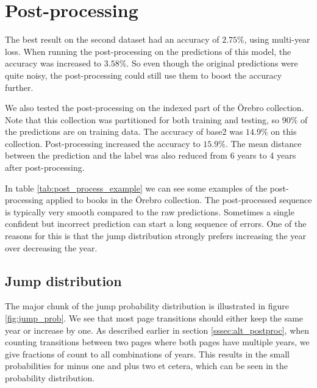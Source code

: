 


\section{Post-processing} \label{sec:result_post_process}

The best result on the second dataset had an accuracy of $2.75\%$, using multi-year loss. When running the post-processing on the predictions of this model, the accuracy was increased to $3.58\%$. So even though the original predictions were quite noisy, the post-processing could still use them to boost the accuracy further.

We also tested the post-processing on the indexed part of the Örebro collection. Note that this collection was partitioned for both training and testing, so $90\%$ of the predictions are on training data. The accuracy of base2 was $14.9\%$ on this collection. Post-processing increased the accuracy to $15.9\%$. The mean distance between the prediction and the label was also reduced from 6 years to 4 years after post-processing.



In table \ref{tab:post_process_example} we can see some examples of the post-processing applied to books in the Örebro collection. The post-processed sequence is typically very smooth compared to the raw predictions. Sometimes a single confident but incorrect prediction can start a long sequence of errors. One of the reasons for this is that the jump distribution strongly prefers increasing the year over decreasing the year.

\subsection{Jump distribution}



The major chunk of the jump probability distribution is illustrated in figure \ref{fig:jump_prob}. We see that most page transitions should either keep the same year or increase by one.
As described earlier in section \ref{sssec:alt_postproc}, when counting transitions between two pages where both pages have multiple years, we give fractions of count to all combinations of years. This results in the small probabilities for minus one and plus two et cetera, which can be seen in the probability distribution.


